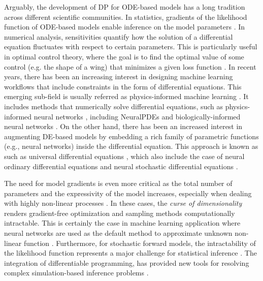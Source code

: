 Arguably, the development of DP for ODE-based models has a long tradition across different scientific communities.
In statistics, gradients of the likelihood function of ODE-based models enable inference on the model parameters \cite{ramsay2017dynamic}. 
In numerical analysis, sensitivities quantify how the solution of a differential equation fluctuates with respect to certain parameters. 
This is particularly useful in optimal control theory, where the goal is to find the optimal value of some control (e.g. the shape of a wing) that minimizes a given loss function \cite{Giles_Pierce_2000}. 
In recent years, there has been an increasing interest in designing machine learning workflows that include constraints in the form of differential equations.
This emerging sub-field is usually referred as physics-informed machine learning \cite{Karniadakis_Kevrekidis_Lu_Perdikaris_Wang_Yang_2021, thuerey2021pbdl}.
It includes methods that numerically solve differential equations, such as physics-informed neural networks \cite{PINNs_2019}, including NeuralPDEs \cite{Zubov_McCarthy_Ma_Calisto_Pagliarino_Azeglio_Bottero_Luján_Sulzer_Bharambe_et} and biologically-informed neural networks \cite{Lagergren_Nardini_Baker_Simpson_Flores_2020}. 
On the other hand, there has been an increased interest in augmenting DE-based models by embedding a rich family of parametric functions (e.g., neural networks) inside the differential equation.  
This approach is known as such as universal differential equations \cite{rackauckas2020universal, Dandekar_2020}, which also include the case of neural ordinary differential equations \cite{chen_neural_2019} and neural stochastic differential equations \cite{li2020scalable}.

The need for model gradients is even more critical as the total number of parameters and the expressivity of the model increases, especially when dealing with highly non-linear processes \cite{Karniadakis_Kevrekidis_Lu_Perdikaris_Wang_Yang_2021}.
In these cases, the \textit{curse of dimensionality} renders gradient-free optimization and sampling methods computationally intractable. 
This is certainly the case in machine learning application where neural networks are used as the default method to approximate unknown non-linear function \cite{LeCun2015}. 
Furthermore, for stochastic forward models, the intractability of the likelihood function represents a major challenge for statistical inference \cite{Cranmer_Brehmer_Louppe_2020}.
The integration of differentiable programming, has provided new tools for resolving complex simulation-based inference problems \cite{Cranmer_Brehmer_Louppe_2020}.

